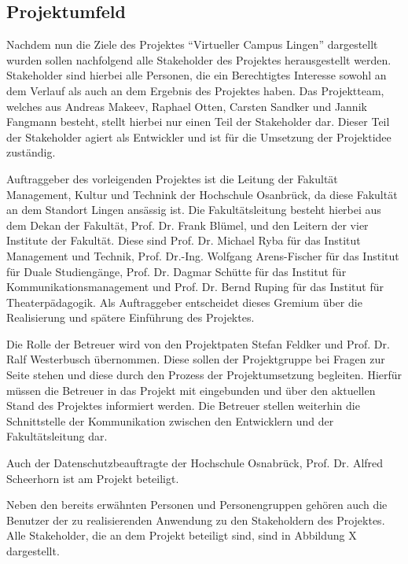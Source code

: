 \subsection{Projektumfeld}
\label{sec:Projektumfeld}

Nachdem nun die Ziele des Projektes "`Virtueller Campus Lingen"' dargestellt
wurden sollen nachfolgend alle Stakeholder des Projektes herausgestellt werden.
Stakeholder sind hierbei alle Personen, die ein Berechtigtes Interesse sowohl an
dem Verlauf als auch an dem Ergebnis des Projektes haben. Das Projektteam,
welches aus Andreas Makeev, Raphael Otten, Carsten Sandker und Jannik Fangmann
besteht, stellt hierbei nur einen Teil der Stakeholder dar. Dieser Teil der
Stakeholder agiert als Entwickler und ist für die Umsetzung der Projektidee
zuständig.

Auftraggeber des vorleigenden Projektes ist die Leitung der Fakultät Management,
Kultur und Technink der Hochschule Osanbrück, da diese Fakultät an dem Standort
Lingen ansässig ist. Die Fakultätsleitung besteht hierbei aus dem Dekan der
Fakultät, Prof. Dr. Frank Blümel, und den Leitern der vier Institute der
Fakultät. Diese sind Prof. Dr. Michael Ryba für das Institut Management und
Technik, Prof. Dr.-Ing. Wolfgang Arens-Fischer für das Institut für Duale
Studiengänge, Prof. Dr. Dagmar Schütte für das Institut für
Kommunikationsmanagement und Prof. Dr. Bernd Ruping für das Institut für
Theaterpädagogik. Als Auftraggeber entscheidet dieses Gremium über die
Realisierung und spätere Einführung des Projektes.


Die Rolle der Betreuer wird von den Projektpaten Stefan Feldker und Prof. Dr.
Ralf Westerbusch übernommen. Diese sollen der Projektgruppe bei Fragen zur
Seite stehen und diese durch den Prozess der Projektumsetzung begleiten. Hierfür
müssen die Betreuer in das Projekt mit eingebunden und über den aktuellen Stand
des Projektes informiert werden. Die Betreuer stellen weiterhin die
Schnittstelle der Kommunikation zwischen den Entwicklern und der
Fakultätsleitung dar.


Auch der Datenschutzbeauftragte der Hochschule Osnabrück, Prof. Dr. Alfred
Scheerhorn ist am Projekt beteiligt. 

Neben den bereits erwähnten Personen und Personengruppen gehören auch die
Benutzer der zu realisierenden Anwendung zu den Stakeholdern des Projektes.
Alle Stakeholder, die an dem Projekt beteiligt sind, sind in Abbildung X
dargestellt.
